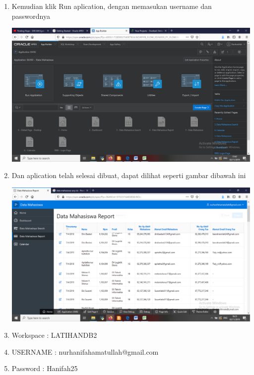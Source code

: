 \begin{enumerate}
    \item Kemudian klik Run aplication, dengan memasukan username dan passwordnya
	\begin{center}
    \includegraphics[scale=0.2]{Apex/17.png}
    \end{center}
    
     \item Dan aplication telah selesai dibuat, dapat dilihat seperti gambar dibawah ini
	\begin{center}
    \includegraphics[scale=0.2]{Apex/18.png}
    \end{center}
    
    \item Workspace : LATIHANDB2
    \item USERNAME : nurhanifahamatullah@gmail.com
    \item Password : Hanifah25
     
     

\end{enumerate}
